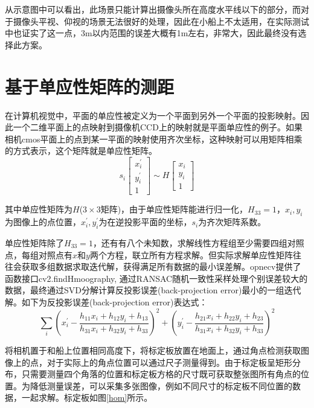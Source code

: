 \documentclass[cn,12pt,color=mine,scheme=chinese,bibstyle=gb7714-2015]{elegantbook}
\begin{document}
从示意图中可以看出，此场景只能计算出摄像头所在高度水平线以下的部分，而对于摄像头平视、仰视的场景无法很好的处理，因此在小船上不太适用，在实际测试中也证实了这一点，3m以内范围的误差大概有1m左右，非常大，因此最终没有选择此方案。

\section{基于单应性矩阵的测距}
在计算机视觉中，平面的单应性被定义为一个平面到另外一个平面的投影映射。因此一个二维平面上的点映射到摄像机CCD上的映射就是平面单应性的例子。如果相机cmos平面上的点到某一平面的映射使用齐次坐标，这种映射可以用矩阵相乘的方式表示，这个矩阵就是单应性矩阵。
\begin{equation}
	s_{i}\left[\begin{array}{c}
		x_{i}^{\prime} \\
		y_{i}^{\prime} \\
		1
	\end{array}\right] \sim H\left[\begin{array}{c}
		x_{i} \\
		y_{i} \\
		1
	\end{array}\right]
\end{equation}

其中单应性矩阵为$H$($3\times3$矩阵)，由于单应性矩阵能进行归一化，$H_{33}=1$，$x_i,y_{i}$为图像上的点位置，$x_{i}^{'},y_{i}^{'}$为在逆投影平面的坐标，$s_{i}$为齐次矩阵系数。

\begin{note}[求解单应性矩阵]
	单应性矩阵除了$H_{33}=1$，还有有八个未知数，求解线性方程组至少需要四组对照点，每组对照点有$x$和$y$两个方程，联立所有方程求解。但实际求解单应性矩阵往往会获取多组数据求取迭代解，获得满足所有数据的最小误差解。opnecv提供了函数接口cv2.findHmoography, 通过RANSAC随机一致性采样处理个别误差较大的数据，最终通过SVD分解计算反投影误差(back-projection error)最小的一组迭代解。如下为反投影误差(back-projection error)表达式：
	\begin{equation}
		\sum_{i}\left(x_{i}^{\prime}-\frac{h_{11} x_{i}+h_{12} y_{i}+h_{13}}{h_{31} x_{i}+h_{32} y_{i}+h_{33}}\right)^{2}+\left(y_{i}^{\prime}-\frac{h_{21} x_{i}+h_{22} y_{i}+h_{23}}{h_{31} x_{i}+h_{32} y_{i}+h_{33}}\right)^{2}
	\end{equation}
\end{note}

\begin{note}[室内标定单应性矩阵]
	将相机置于和船上位置相同高度下，将标定板放置在地面上，通过角点检测获取图像上的点，对于实际上的角点位置可以通过尺子测量得到。由于标定板呈矩形分布，只需要测量四个角落的位置和标定板方格的尺寸既可获取整张图所有角点的位置。为降低测量误差，可以采集多张图像，例如不同尺寸的标定板不同位置的数据，一起求解。标定板如图\ref{hom}所示。
\end{note}
\end{document}
